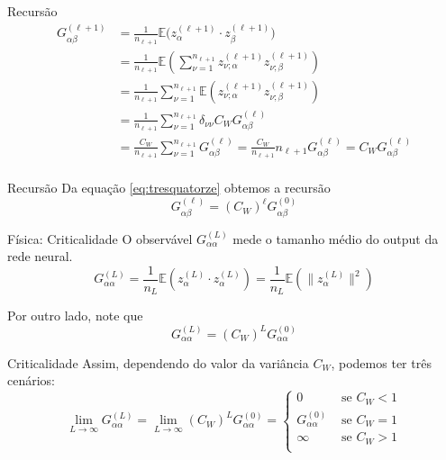 \documentclass{beamer}
\newcommand{\EE}{\mathbb{E}}
\newcommand{\aaA}{\alpha}
\newcommand{\aaB}{\beta}
\def\eell{{(\ell)}}
\def\eellum{{(\ell+1)}}
\begin{document}
\begin{frame}{Recursão}
	\begin{align*}\tag{3.14}\label{eq:tresquatorze}
		G^\eellum_{\aaA\aaB} &= \frac{1}{n_{\ell+1}}\EE\big(z^\eellum_{\aaA}\cdot z^\eellum_{\aaB}\big) \\
		&= \frac{1}{n_{\ell+1}}\EE\left(\sum_{\nu=1}^{n_{\ell+1}}z^\eellum_{\nu;\aaA} z^\eellum_{\nu;\aaB}\right) \\
		&= \frac{1}{n_{\ell+1}}\sum_{\nu=1}^{n_{\ell+1}} \EE\left(z^\eellum_{\nu;\aaA} z^\eellum_{\nu;\aaB}\right) \\
		&= \frac{1}{n_{\ell+1}}\sum_{\nu=1}^{n_{\ell+1}} \delta_{\nu\nu}C_WG^\eell_{\aaA\aaB} \\
		&= \frac{C_W}{n_{\ell+1}}\sum_{\nu=1}^{n_{\ell+1}} G^\eell_{\aaA\aaB} = \frac{C_W}{n_{\ell+1}}n_{\ell+1}G^\eell_{\aaA\aaB} = C_WG^\eell_{\aaA\aaB}\\ 
	\end{align*}
\end{frame}

\begin{frame}{Recursão}
	Da equação \eqref{eq:tresquatorze} obtemos a recursão
	\begin{equation*}\tag{3.15}\label{eq:trezquinze}
		G^\eell_{\aaA\aaB} = (C_W)^{\ell}G^{(0)}_{\aaA\aaB}
	\end{equation*}
\end{frame}

\begin{frame}{Física: Criticalidade}
	O observável $G^{(L)}_{\aaA\aaA}$ mede o tamanho médio do output da rede neural.
	\begin{equation*}\tag{3.16}
		G^{(L)}_{\aaA\aaA} = \frac{1}{n_L}\EE\left(z^{(L)}_\aaA\cdot z^{(L)}_\aaA\right) =  \frac{1}{n_L}\EE\left(\big\|z^{(L)}_\aaA\big\|^2\right)
	\end{equation*}

	Por outro lado, note que 
	$$G^{(L)}_{\aaA\aaA} = (C_W)^LG^{(0)}_{\aaA\aaA}$$
\end{frame}

\begin{frame}{Criticalidade}
	Assim, dependendo do valor da variância $C_W$, podemos ter três cenários:
	\begin{equation*}
		\lim_{L\to\infty} G^{(L)}_{\aaA\aaA} = \lim_{L\to\infty} (C_W)^LG^{(0)}_{\aaA\aaA} =
	\begin{cases}
		0  &\text{ se } C_W < 1  \\
		G^{(0)}_{\aaA\aaA}&\text{ se }  C_W = 1 \\
		\infty &\text{ se  } C_W>1\\
	\end{cases}
	\end{equation*}
\end{frame}
\end{document}
